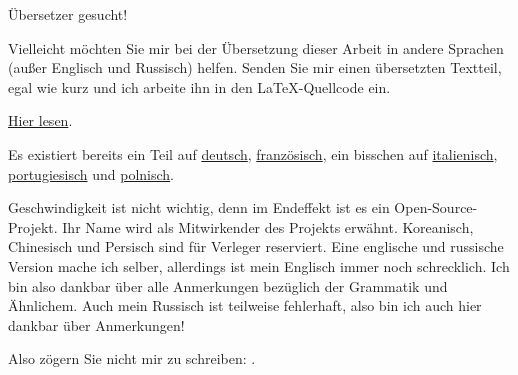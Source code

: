 \vspace*{\fill}

\Huge Übersetzer gesucht!

\normalsize

\bigskip
\bigskip
\bigskip

Vielleicht möchten Sie mir bei der Übersetzung dieser Arbeit in andere Sprachen (außer Englisch und
Russisch) helfen. Senden Sie mir einen übersetzten Textteil, egal wie kurz und ich arbeite ihn in den
\LaTeX{}-Quellcode ein.

\href{\GitHubBlobMasterURL/Translation.md}{Hier lesen}.

Es existiert bereits ein Teil auf \href{https://beginners.re/RE4B-DE.pdf}{deutsch},
\href{https://beginners.re/RE4B-FR.pdf}{französisch}, ein bisschen auf
\href{https://yurichev.com/tmp/RE4B-IT-partial.pdf}{italienisch},
\href{https://yurichev.com/tmp/RE4B-PTBR-lite2.pdf}{portugiesisch} und
\href{https://yurichev.com/tmp/RE4B-PL.pdf}{polnisch}.

Geschwindigkeit ist nicht wichtig, denn im Endeffekt ist es ein Open-Source-Projekt.
Ihr Name wird als Mitwirkender des Projekts erwähnt.
Koreanisch, Chinesisch und Persisch sind für Verleger reserviert.
Eine englische und russische Version mache ich selber, allerdings ist mein Englisch immer noch schrecklich.
Ich bin also dankbar über alle Anmerkungen bezüglich der Grammatik und Ähnlichem.
Auch mein Russisch ist teilweise fehlerhaft, also bin ich auch hier dankbar über Anmerkungen!%

Also zögern Sie nicht mir zu schreiben: \GTT{\EMAIL}.

\vspace*{\fill}
\vfill
